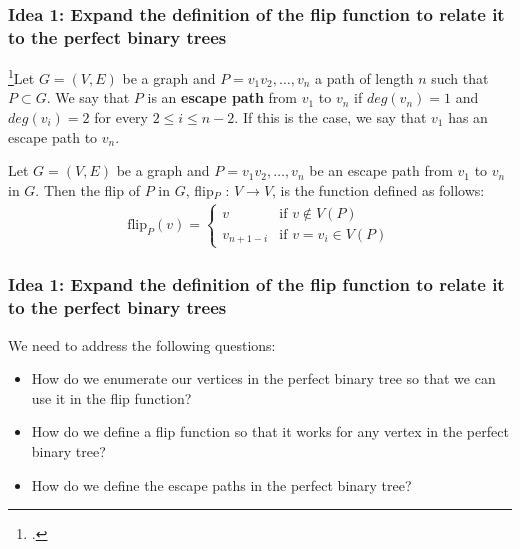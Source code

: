 \documentclass[10pt,]{beamer}
\theoremstyle{conjectureStyle}
\theoremstyle{notationStyle}
\begin{document}
\begin{frame}\frametitle{Idea 1: Expand the definition of the flip function to relate it to the perfect binary trees}
    \begin{definition}
        \footcite{MR2763040}Let $G = (V, E)$ be a graph and $P = v_1v_2, \ldots , v_n$ a path of length $n$ such that $P \subset G$. We say that $P$ is an \textbf{escape path} from $v_1$ to $v_n$ if $deg(v_n) = 1$ and $deg(v_i) = 2$ for every $2 \leq i \leq n - 2$. If this is the case, we say that $v_1$ has an escape path to $v_n$.
    \end{definition}

    \begin{definition}
        Let $G = (V, E)$ be a graph and $P = v_1v_2, \ldots, v_n$ be an escape path from $v_1$ to $v_n$ in $G$. Then the flip of $P$ in $G$, flip$_P$ : $V \rightarrow V$, is the function defined as follows:
        \begin{align*}
            \text{flip}_P(v) = \begin{cases}
                                   v             & \text{if } v \not\in V(P)   \\
                                   v_{n + 1 - i} & \text{if } v = v_i \in V(P)
                               \end{cases}
        \end{align*}
    \end{definition}
\end{frame}

\begin{frame}\frametitle{Idea 1: Expand the definition of the flip function to relate it to the perfect binary trees}
    We need to address the following questions:
    \begin{itemize}
        \item How do we enumerate our vertices in the perfect binary tree so that we can use it in the flip function?
        \item How do we define a flip function so that it works for any vertex in the perfect binary tree?
        \item How do we define the escape paths in the perfect binary tree?
    \end{itemize}
\end{frame}
\end{document}
